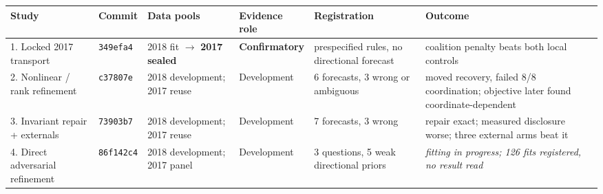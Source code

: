 \begin{tabular}{@{}p{2.5cm}p{1.2cm}p{2.2cm}p{1.9cm}p{2.5cm}p{3.5cm}@{}}
\toprule
Study & Commit & Data pools & Evidence role & Registration & Outcome \\
\midrule
1. Locked 2017 transport & \texttt{349efa4} & 2018 fit $\rightarrow$ \textbf{2017 sealed} & \textbf{Confirmatory} & prespecified rules, no directional forecast & coalition penalty beats both local controls \\
2. Nonlinear / rank refinement & \texttt{c37807e} & 2018 development; 2017 reuse & Development & 6 forecasts, 3 wrong or ambiguous & moved recovery, failed 8/8 coordination; objective later found coordinate-dependent \\
3. Invariant repair + externals & \texttt{73903b7} & 2018 development; 2017 reuse & Development & 7 forecasts, 3 wrong & repair exact; measured disclosure worse; three external arms beat it \\
4. Direct adversarial refinement & \texttt{\texttt{86f142c4}} & 2018 development; 2017 panel & Development & 3 questions, 5 weak directional priors & \emph{fitting in progress; 126 fits registered, no result read} \\
\bottomrule
\end{tabular}
